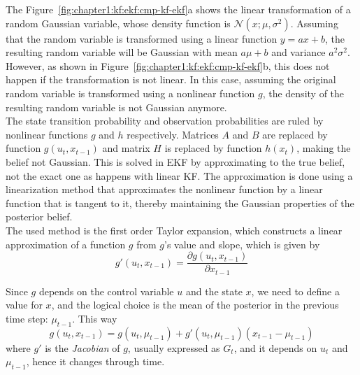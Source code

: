 The Figure~\ref{fig:chapter1:kf:ekf:cmp-kf-ekf}a shows the linear transformation of a random Gaussian variable, whose density function is $\mathcal{N}\left(x; \mu, \sigma^2 \right)$. Assuming that the random variable is transformed using a linear function $y = ax + b$, the resulting random variable will be Gaussian with mean $a\mu + b$ and variance $a^2 \sigma^2$.\\

However, as shown in Figure~\ref{fig:chapter1:kf:ekf:cmp-kf-ekf}b, this does not happen if the transformation is not linear. In this case, assuming the original random variable is transformed using a nonlinear function $g$, the density of the resulting random variable is not Gaussian anymore.\\

The state transition probability and observation probabilities are ruled by nonlinear functions $g$ and $h$ respectively. Matrices $A$ and $B$ are replaced by function $g\left(u_t, x_{t-1}\right)$ and matrix $H$ is replaced by function $h \left(x_t\right)$, making the belief not Gaussian. This is solved in \ac{EKF} by approximating to the true belief, not the exact one as happens with linear \ac{KF}. The approximation is done using a linearization method that approximates the nonlinear function by a linear function that is tangent to it, thereby maintaining the Gaussian properties of the posterior belief. \\

The used method is the first order Taylor expansion, which constructs a linear approximation of a function $g$ from $g$'s value and slope, which is given by
\begin{equation}
    g' \left(u_t, x_{t-1}\right) = \frac{\partial g\left(u_t, x_{t-1}\right)}{\partial x_{t-1}}
    \label{eq:chapter1:kf:ekf:g-derivative}
\end{equation}

 Since $g$ depends on the control variable $u$ and the state $x$, we need to define a value for $x$, and the logical choice is the mean of the posterior in the previous time step: $\mu_{t-1}$. This way
 \begin{equation}
    g \left(u_t, x_{t-1}\right) = g \left(u_t, \mu_{t-1}\right) + g' \left(u_t, \mu_{t-1}\right)\left(x_{t-1} - \mu_{t-1}\right)
    \label{eq:chapter1:kf:ekf:g-mean-cov}
 \end{equation}
where $g'$ is the \emph{Jacobian} of $g$, usually expressed as $G_t$, and it depends on $u_t$ and $\mu_{t-1}$, hence it changes through time.\\

